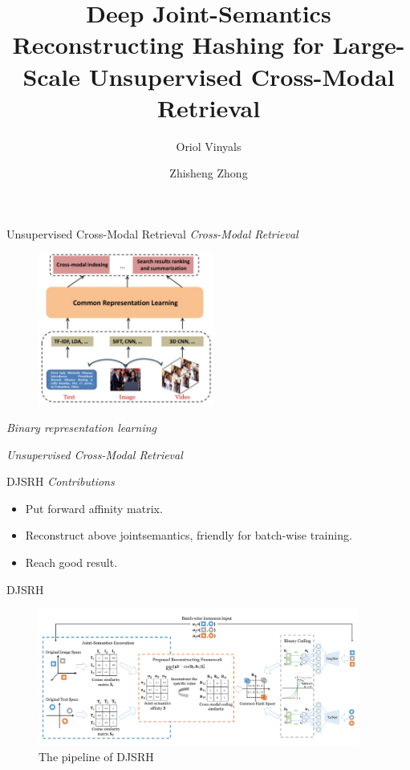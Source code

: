 \documentclass[serif]{beamer}
\begin{document}
\title{Deep Joint-Semantics Reconstructing Hashing for Large-Scale Unsupervised Cross-Modal Retrieval}
\author[Shupeng Su, Meire Fortunato] %
{Oriol Vinyals \and Zhisheng Zhong}
\date{}
\frame{\titlepage}

\begin{frame}{Unsupervised Cross-Modal Retrieval}
\emph{Cross-Modal Retrieval}
\begin{figure}
    \includegraphics[height=5cm]{2.PNG}
\end{figure}
\emph{Binary representation learning}

\emph{Unsupervised Cross-Modal Retrieval}
\end{frame}

\begin{frame}{DJSRH}
\emph{Contributions}
\begin{itemize}
	\item Put forward affinity matrix.
	\item Reconstruct above jointsemantics, friendly for batch-wise training.
	\item Reach good result.
\end{itemize}
\end{frame}

\begin{frame}{DJSRH}
\begin{figure}
    \includegraphics[height=4.5cm]{3.PNG}
	\caption{The pipeline of DJSRH}
\end{figure}
\end{frame}
\end{document}

